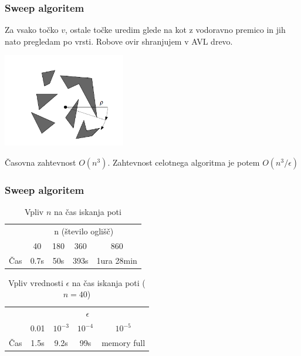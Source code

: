 \documentclass{beamer}
\begin{document}
\begin{frame}
    \frametitle{Sweep algoritem}
    
    Za vsako točko $v$, ostale točke uredim glede na kot z vodoravno premico in jih nato pregledam po vrsti. Robove ovir shranjujem v AVL drevo.

    \pause

    \includegraphics[width=0.4\textwidth]{sweep.png}

    \pause

    Časovna zahtevnost $O(n^3)$. Zahtevnost celotnega algoritma je potem  $O(n^3/\epsilon)$

    
\end{frame}

\begin{frame}
    \frametitle{Sweep algoritem}
    \begin{table}[h]
        \centering
        \begin{tabular}{|c|c|c|c|c|}
            \hline
            & \multicolumn{4}{c|}{n (število oglišč)} \\
            \cline{2-5}
            & 40 & 180 & 360 & 860 \\
            \hline
            Čas & 0.7s & 50s &  393s &  1ura 28min\\
            \hline
        \end{tabular}
        \caption{Vpliv $n$ na čas iskanja poti}

    \end{table}
   
    \begin{table}[h]
        \centering
        \begin{tabular}{|c|c|c|c|c|}
            \hline
            & \multicolumn{4}{c|}{$\epsilon$} \\
            \cline{2-5}
            & 0.01 & $10^{-3}$ & $10^{-4}$ & $10^{-5}$ \\
            \hline
            Čas & 1.5s & 9.2s & 99s  &  memory full \\
            \hline
           
        \end{tabular}
        \caption{Vpliv vrednosti $\epsilon$ na čas iskanja poti ($n = 40$)}
    \end{table}
\end{frame}
\end{document}
